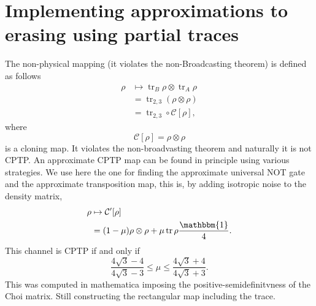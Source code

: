 \documentclass[letterpaper,12pt]{article} %
\newcommand{\one}{\mathbbm{1}}
\newcommand{\<}{\langle}
\newcommand{\mcC}{\mathcal{C}}
\newcommand{\tr}{\mathop{\mathrm{tr}}\nolimits}
\begin{document}
\section{Implementing approximations to erasing using partial traces}
The non-physical mapping (it violates the non-Broadcasting theorem) is defined as follows
\begin{align}
\rho &\mapsto \tr_B \rho \otimes \tr_A \rho\\
&= \tr_{2,3} \left( \rho \otimes \rho\right)\\
&= \tr_{2,3}\circ \mcC[\rho],
\end{align}
where
\begin{equation}
\mcC[\rho]=\rho \otimes \rho
\end{equation}
is a cloning map.  It violates the non-broadvasting theorem and naturally it is not CPTP. An approximate CPTP map can be found in principle using various strategies. We use here the one for finding the approximate universal NOT gate and the approximate transposition map, this is, by adding isotropic noise to the density matrix,
\begin{align}
\rho &\mapsto \mcC'[\rho]\nonumber \\
&= (1-\mu) \rho \otimes \rho + \mu \tr \rho \frac{\one}{4}.
\end{align}
This channel is CPTP if and only if
\begin{equation}
\frac{4 \sqrt{3}-4}{4 \sqrt{3}-3}\leq \mu \leq \frac{4 \sqrt{3}+4}{4 \sqrt{3}+3}.
\end{equation}
This was computed in mathematica imposing the positive-semidefinitvness of the Choi matrix.
Still constructing the rectangular map including the trace.

 
\end{document}
